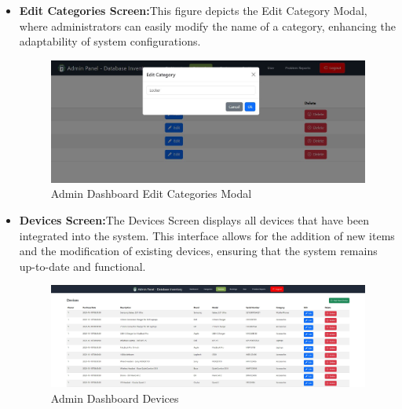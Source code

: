 \begin{itemize}
\item \textbf {Edit Categories Screen:}This figure depicts the Edit Category Modal, where administrators can easily modify the name of a category, enhancing the adaptability of system configurations.
\begin{figure}[h]
    \centering
    \includegraphics[width=1\linewidth]{images/edit categorie.JPG}
    \caption{Admin Dashboard Edit Categories Modal}
    \label{fig:edit-category-modal}
\end{figure}


\item \textbf {Devices Screen:}The Devices Screen displays all devices that have been integrated into the system. This interface allows for the addition of new items and the modification of existing devices, ensuring that the system remains up-to-date and functional.
\begin{figure}[h]
    \centering
    \includegraphics[width=1\linewidth]{images/devices.JPG}
    \caption{Admin Dashboard Devices}
    \label{fig:devices-dashboard}
\end{figure}


\end{itemize}
